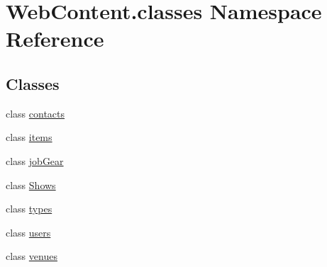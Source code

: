 \hypertarget{namespace_web_content_1_1classes}{}\section{Web\+Content.\+classes Namespace Reference}
\label{namespace_web_content_1_1classes}
\subsection*{Classes}
\begin{DoxyCompactItemize}
\item 
class \hyperlink{class_web_content_1_1classes_1_1contacts}{contacts}
\item 
class \hyperlink{class_web_content_1_1classes_1_1items}{items}
\item 
class \hyperlink{class_web_content_1_1classes_1_1job_gear}{job\+Gear}
\item 
class \hyperlink{class_web_content_1_1classes_1_1_shows}{Shows}
\item 
class \hyperlink{class_web_content_1_1classes_1_1types}{types}
\item 
class \hyperlink{class_web_content_1_1classes_1_1users}{users}
\item 
class \hyperlink{class_web_content_1_1classes_1_1venues}{venues}
\end{DoxyCompactItemize}
